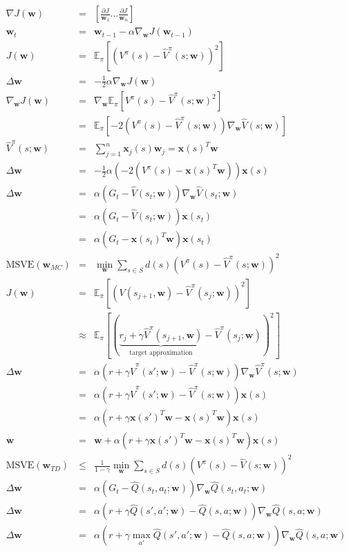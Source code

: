 \documentclass[]{article}
\newcommand{\vect}[1]{\mathbf{#1}}
\begin{document}
\begin{eqnarray}
    \nabla J(\vect{w}) &=& \left[ \frac{\partial J}{\vect{w}_1} \ldots \frac{\partial J}{\vect{w}_n} \right]\\
    \vect{w}_t &=& \vect{w}_{t-1} - \alpha \nabla_{\vect{w}} J(\vect{w}_{t-1})\\
    J(\vect{w}) &=& \mathbb{E}_{\pi} [(V^\pi(s) - \hat{V}^\pi(s;\vect{w}))^2]\\
    \Delta \vect{w} &=& - \frac{1}{2} \alpha \nabla_{\vect{w}} J(\vect{w})\\
    \nabla_{\vect{w}} J(\vect{w}) &=& \nabla_{\vect{w}} \mathbb{E}_{\pi}[V^\pi (s) - \hat{V}^\pi (s; \vect{w})^2]\\
    &=& \mathbb{E}_\pi [-2 (V^\pi(s) - \hat{V}^\pi (s;\vect{w})) \nabla_{\vect{w}} \hat{V}(s;\vect{w})]\\
    \hat{V}^\pi(s; \vect{w}) &=& \sum_{j=1}^n \vect{x}_j (s) \vect{w}_j = \vect{x}(s)^T\vect{w}\\
    \Delta \vect{w} &=& -\frac{1}{2} \alpha(-2(V^\pi(s) - \vect{x}(s)^T \vect{w})) \vect{x}(s)\\
    \Delta \vect{w} &=& \alpha (G_t - \hat{V} (s_t; \vect{w})) \nabla_{\vect{w}}\hat{V}(s_t; \vect{w})\\
    &=& \alpha (G_t - \hat{V} (s_t; \vect{w})) \vect{x}(s_t) \nonumber\\
    &=& \alpha (G_t - \vect{x}(s_t)^T \vect{w}) \vect{x}(s_t) \nonumber\\
    \text{MSVE}(\vect{w}_{MC}) &=& \min_{\vect{w}}\sum_{s \in S} d(s) (V^\pi (s) - \hat{V}^\pi(s;\vect{w}))^2 \\
    J(\vect{w}) &=& \mathbb{E}_\pi [(V(s_{j+1}, \vect{w}) - \hat{V}^\pi(s_j;\vect{w}))^2]\\
    &\approx& \mathbb{E}_\pi [(\underbrace{r_j + \gamma \hat{V}^\pi(s_{j+1}, \vect{w})}_{\text{target approximation}} - \hat{V}^\pi(s_j;\vect{w}))^2]\nonumber \\
    \Delta \vect{w} &=& \alpha( r + \gamma \hat{V}^\pi(s'; \vect{w}) - \hat{V}^\pi(s;\vect{w})) \nabla_{\vect{w}} \hat{V}^\pi (s;\vect{w})\\
    &=& \alpha( r + \gamma \hat{V}^\pi(s'; \vect{w}) - \hat{V}^\pi(s;\vect{w})) \vect{x}(s) \nonumber\\
    &=& \alpha( r + \gamma \vect{x}(s')^T \vect{w} - \vect{x}(s)^T\vect{w}) \vect{x}(s) \nonumber\\
    \vect{w} &=& \vect{w} + \alpha( r + \gamma \vect{x}(s')^T \vect{w} - \vect{x}(s)^T\vect{w}) \vect{x}(s)\\
    \text{MSVE}(\vect{w}_{TD}) &\leq& \frac{1}{1-\gamma} \min_\vect{w}\sum_{s\in S} d(s) (V^\pi(s) - \hat{V}(s;\vect{w}))^2\\
    \Delta \vect{w} &=& \alpha(G_t - \hat{Q}(s_t,a_t; \vect{w})) \nabla_{\vect{w}} \hat{Q}(s_t, a_t; \vect{w})\\
    \Delta \vect{w} &=& \alpha (r + \gamma \hat{Q}(s',a';\vect{w}) - \hat{Q}(s,a;\vect{w})) \nabla_{\vect{w}}\hat{Q}(s,a;\vect{w}) \\
    \Delta \vect{w} &=& \alpha (r + \gamma \max_{a'} \hat{Q}(s',a';\vect{w}) - \hat{Q}(s,a;\vect{w})) \nabla_{\vect{w}}\hat{Q}(s,a;\vect{w}) 
\end{eqnarray}
\end{document}
